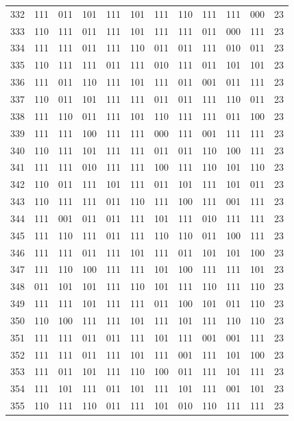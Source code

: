 \begin{longtable}{r*{10}{c}r}
332 & 111 & 011 & 101 & 111 & 101 & 111 & 110 & 111 & 111 & 000 & 23\\
333 & 110 & 111 & 011 & 111 & 101 & 111 & 111 & 011 & 000 & 111 & 23\\
334 & 111 & 111 & 011 & 111 & 110 & 011 & 011 & 111 & 010 & 011 & 23\\
335 & 110 & 111 & 111 & 011 & 111 & 010 & 111 & 011 & 101 & 101 & 23\\
336 & 111 & 011 & 110 & 111 & 101 & 111 & 011 & 001 & 011 & 111 & 23\\
337 & 110 & 011 & 101 & 111 & 111 & 011 & 011 & 111 & 110 & 011 & 23\\
338 & 111 & 110 & 011 & 111 & 101 & 110 & 111 & 111 & 011 & 100 & 23\\
339 & 111 & 111 & 100 & 111 & 111 & 000 & 111 & 001 & 111 & 111 & 23\\
340 & 110 & 111 & 101 & 111 & 111 & 011 & 011 & 110 & 100 & 111 & 23\\
341 & 111 & 111 & 010 & 111 & 111 & 100 & 111 & 110 & 101 & 110 & 23\\
342 & 110 & 011 & 111 & 101 & 111 & 011 & 101 & 111 & 101 & 011 & 23\\
343 & 110 & 111 & 111 & 011 & 110 & 111 & 100 & 111 & 001 & 111 & 23\\
344 & 111 & 001 & 011 & 011 & 111 & 101 & 111 & 010 & 111 & 111 & 23\\
345 & 111 & 110 & 111 & 011 & 111 & 110 & 110 & 011 & 100 & 111 & 23\\
346 & 111 & 111 & 011 & 111 & 101 & 111 & 011 & 101 & 101 & 100 & 23\\
347 & 111 & 110 & 100 & 111 & 111 & 101 & 100 & 111 & 111 & 101 & 23\\
348 & 011 & 101 & 101 & 111 & 110 & 101 & 111 & 110 & 111 & 110 & 23\\
349 & 111 & 111 & 101 & 111 & 111 & 011 & 100 & 101 & 011 & 110 & 23\\
350 & 110 & 100 & 111 & 111 & 101 & 111 & 101 & 111 & 110 & 110 & 23\\
351 & 111 & 111 & 011 & 011 & 111 & 101 & 111 & 001 & 001 & 111 & 23\\
352 & 111 & 111 & 011 & 111 & 101 & 111 & 001 & 111 & 101 & 100 & 23\\
353 & 111 & 011 & 101 & 111 & 110 & 100 & 011 & 111 & 101 & 111 & 23\\
354 & 111 & 101 & 111 & 011 & 101 & 111 & 101 & 111 & 001 & 101 & 23\\
355 & 110 & 111 & 110 & 011 & 111 & 101 & 010 & 110 & 111 & 111 & 23\\

\end{longtable}

